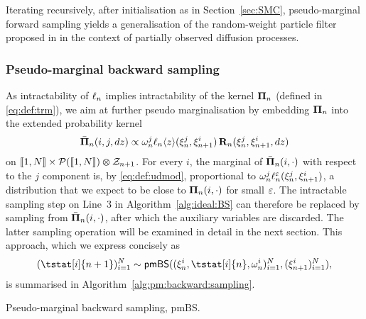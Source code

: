 Iterating recursively, after initialisation as in Section~\ref{sec:SMC}, pseudo-marginal forward sampling yields a generalisation of the random-weight particle filter proposed in \cite{fearnhead2008particle} in the context of partially observed diffusion processes. 

\subsubsection{Pseudo-marginal backward sampling}
\label{eq:sec:backward:sampling:pseudo:marg}

As intractability of $\ell_{n}$ implies intractability of the kernel $\boldsymbol{\Pi}_{n}$ (defined in \eqref{eq:def:trm}), we aim at further pseudo marginalisation by embedding $\boldsymbol{\Pi}_{n}$ into the extended probability kernel  
$$
\bar{\boldsymbol{\Pi}}_{n}(i, j, d z) \propto \omega_{n}^{j} \ell_{n} \langle z \rangle(\xi_{n}^{j}, \xi_{n + 1}^{i}) \, \mathbf{R}_{n}(\xi_{n}^{j}, \xi_{n + 1}^{i}, d z)
$$
on $\llbracket 1, N \rrbracket \times \mathcal{P}(\llbracket 1, N \rrbracket) \varotimes \mathcal{Z}_{n + 1}$. For every $i$, the marginal of $\bar{\boldsymbol{\Pi}}_{n}(i, \cdot)$ with respect to the $j$ component is, by \eqref{eq:def:udmod}, proportional to $\omega_{n}^{j} \ell^\varepsilon_{n}(\xi_{n}^{j}, \xi_{n + 1}^{i})$, a distribution that we expect to be close to $\boldsymbol{\Pi}_{n}(i, \cdot)$ for small $\varepsilon$. The intractable sampling step on Line~3 in Algorithm~\ref{alg:ideal:BS} can therefore be replaced by sampling from $\bar{\boldsymbol{\Pi}}_{n}(i, \cdot)$, after which the auxiliary variables are discarded. The latter sampling operation will be examined in detail in the next section. This approach, which we express concisely as 
$$
    (\tstat[i]{n + 1})_{i = 1}^\N \sim \mathsf{pmBS}((\epart{n}{i}, \tstat[i]{n}, \ewght{n}{i})_{i = 1}^\N, (\epart{n + 1}{i})_{i = 1}^\N), 
$$
is summarised in Algorithm~\ref{alg:pm:backward:sampling}.  

\begin{algorithm}[h] 
\caption{Pseudo-marginal backward sampling, \textsf{pmBS}.} \label{alg:pm:backward:sampling}
\end{algorithm}

